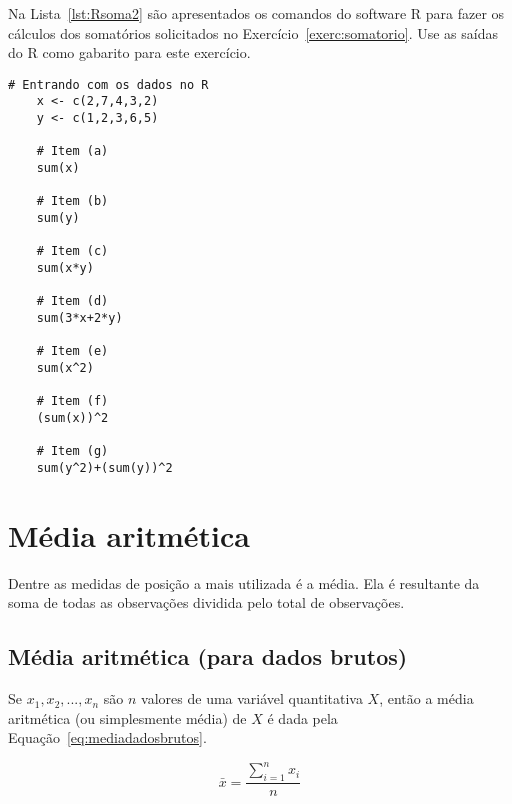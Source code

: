 \documentclass[11pt,fleqn]{book} %
\begin{document}
Na Lista~\ref{lst:Rsoma2} são apresentados os comandos do software R para fazer os cálculos dos somatórios solicitados no Exercício~\ref{exerc:somatorio}. Use as saídas do R como gabarito para este exercício.\\

\begin{scriptsize}
	\estiloR
	\begin{lstlisting}[caption={Comandos do software R}, label=lst:Rsoma2]
	# Entrando com os dados no R
	x <- c(2,7,4,3,2)
	y <- c(1,2,3,6,5)
	
	# Item (a)
	sum(x)
	
	# Item (b)
	sum(y)
	
	# Item (c)
	sum(x*y)

	# Item (d)
	sum(3*x+2*y)
	
	# Item (e)
	sum(x^2)
	
	# Item (f)
	(sum(x))^2
	
	# Item (g)
	sum(y^2)+(sum(y))^2

	\end{lstlisting}
\end{scriptsize}



\section{Média aritmética}

Dentre as medidas de posição a mais utilizada é a média. Ela é resultante da soma de todas as observações dividida pelo total de observações.


\subsection{Média aritmética (para dados brutos)}

Se $x_1, x_2, ..., x_n$ são $n$ valores de uma variável quantitativa $X$, então a média aritmética (ou simplesmente média) de $X$ é dada pela Equação~\ref{eq:mediadadosbrutos}.

\begin{eBox}
\vspace{-0.5cm}
\begin{equation} \label{eq:mediadadosbrutos}
	\bar{x}=\frac{\displaystyle \sum_{i=1}^{n}{x_i}}{n}
\end{equation}
\end{eBox}

\vspace{0.3cm}
\end{document}
